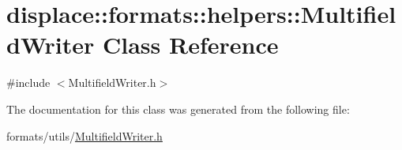 \hypertarget{classdisplace_1_1formats_1_1helpers_1_1_multifield_writer}{}\section{displace\+::formats\+::helpers\+::Multifield\+Writer Class Reference}
\label{classdisplace_1_1formats_1_1helpers_1_1_multifield_writer}


{\ttfamily \#include $<$Multifield\+Writer.\+h$>$}



The documentation for this class was generated from the following file\+:\begin{DoxyCompactItemize}
\item 
formats/utils/\mbox{\hyperlink{_multifield_writer_8h}{Multifield\+Writer.\+h}}\end{DoxyCompactItemize}
